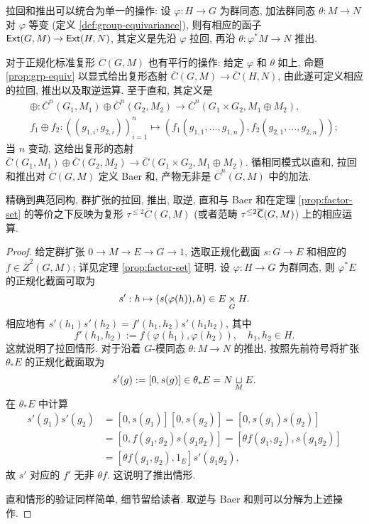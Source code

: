 拉回和推出可以统合为单一的操作: 设 $\varphi: H \to G$ 为群同态, 加法群同态 $\theta: M \to N$ 对 $\varphi$ 等变 (定义 \ref{def:group-equivariance}), 则有相应的函子 $\mathsf{Ext}(G, M) \to \mathsf{Ext}(H, N)$, 其定义是先沿 $\varphi$ 拉回, 再沿 $\theta: \varphi^* M \to N$ 推出.

对于正规化标准复形 $\overline{C}(G, M)$ 也有平行的操作: 给定 $\varphi$ 和 $\theta$ 如上, 命题 \ref{prop:grp-equiv} 以显式给出复形态射 $\overline{C}(G, M) \to \overline{C}(H, N)$, 由此遂可定义相应的拉回, 推出以及取逆运算. 至于直和, 其定义是
\begin{gather*}
	\oplus: \overline{C}^n(G_1, M_1) \oplus \overline{C}^n(G_2, M_2) \to \overline{C}^n(G_1 \times G_2, M_1 \oplus M_2), \\
	f_1 \oplus f_2: ((g_{1, i}, g_{2, i}))_{i=1}^n \mapsto \left( f_1(g_{1,1}, \ldots, g_{1,n}), f_2(g_{2, 1}, \ldots, g_{2, n}) \right);
\end{gather*}
当 $n$ 变动, 这给出复形的态射 $\overline{C}(G_1, M_1) \oplus \overline{C}(G_2, M_2) \to \overline{C}(G_1 \times G_2, M_1 \oplus M_2)$. 循相同模式以直和, 拉回和推出对 $\overline{C}(G, M)$ 定义 Baer 和, 产物无非是 $\overline{C}^n(G, M)$ 中的加法.

\begin{proposition}\label{prop:factor-set-operation}
	精确到典范同构, 群扩张的拉回, 推出, 取逆, 直和与 Baer 和在定理 \ref{prop:factor-set} 的等价之下反映为复形 $\tau^{\leq 2}\overline{C}(G, M)$ (或者范畴 $\tau^{\leq 2} \overline{\mathsf{C}}(G, M)$) 上的相应运算.
\end{proposition}
\begin{proof}
	给定群扩张 $0 \to M \to E \to G \to 1$, 选取正规化截面 $s: G \to E$ 和相应的 $f \in \overline{Z}^2(G, M)$; 详见定理 \ref{prop:factor-set} 证明. 设 $\varphi: H \to G$ 为群同态, 则 $\varphi^* E$ 的正规化截面可取为
	\[ s': h \mapsto (s(\varphi(h)), h) \in E \underset{G}{\times} H. \]
	相应地有 $s'(h_1) s'(h_2) = f'(h_1, h_2) s'(h_1 h_2)$, 其中
	\[ f'(h_1, h_2) := f(\varphi(h_1), \varphi(h_2)), \quad h_1, h_2 \in H. \]
	这就说明了拉回情形. 对于沿着 $G$-模同态 $\theta: M \to N$ 的推出, 按照先前符号将扩张 $\theta_* E$ 的正规化截面取为
	\[ s'(g) := [0, s(g)] \in \theta_* E = N \underset{M}{\sqcup} E . \]
	在 $\theta_* E$ 中计算
	\begin{align*}
		s'(g_1) s'(g_2) & = [0, s(g_1)] [0, s(g_2)] = [0, s(g_1) s(g_2)] \\
		& = [0, f(g_1, g_2) s(g_1 g_2)] = [\theta f(g_1, g_2), s(g_1 g_2)] \\
		& = [\theta f(g_1, g_2), 1_E] s'(g_1 g_2),
	\end{align*}
	故 $s'$ 对应的 $f'$ 无非 $\theta f$. 这说明了推出情形.
	
	直和情形的验证同样简单, 细节留给读者. 取逆与 Baer 和则可以分解为上述操作.
\end{proof}

